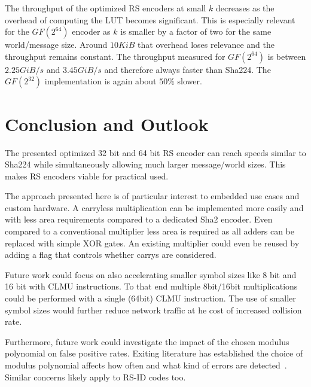 \documentclass[
]{article}
\begin{document}
The throughput of the optimized RS encoders at small $k$ decreases as the overhead of computing the LUT becomes significant. This is especially relevant for the $GF(2^{64})$ encoder as $k$ is smaller by a factor of two for the same world/message size. Around $10 KiB$ that overhead loses relevance and the throughput remains constant. The throughput measured for $GF(2^{64})$ is between $2.25 GiB/s$ and $3.45 GiB/s$ and therefore always faster than Sha224. The  $GF(2^{32})$ implementation is again about $50\%$ slower. 

\begin{figure}


\end{figure}
\begin{figure}

\end{figure}
\newpage

\section{Conclusion and Outlook}

The presented optimized 32 bit and 64 bit RS encoder can reach speeds similar to Sha224 while simultaneously allowing much larger message/world sizes. This makes RS encoders viable for practical used.

The approach presented here is of particular interest to embedded use cases and custom hardware. A carryless multiplication can be implemented more easily and with less area requirements compared to a dedicated Sha2 encoder. Even compared to a conventional multiplier less area is required as all adders can be replaced with simple XOR gates. An existing multiplier  could even be reused by adding a flag that controls whether carrys are considered.

Future work could focus on also accelerating smaller symbol sizes like 8 bit and 16 bit with CLMU instructions. To that end multiple 8bit/16bit multiplications could be performed with a single (64bit) CLMU instruction. The use of smaller symbol sizes would further reduce network traffic at he cost of increased collision rate. 

Furthermore, future work  could investigate the impact of the chosen modulus polynomial on false positive rates. Exiting literature has established the choice of modulus polynomial affects how often and what kind of errors are detected~\cite{Jones2009}. Similar concerns likely apply to RS-ID codes too.

\printbibliography
\end{document}
